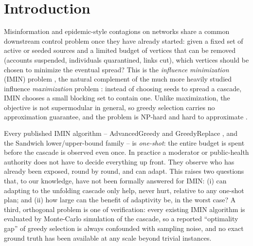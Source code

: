 \documentclass[ijoc,sglanonrev]{informs4}
\begin{document}


\maketitle

\section{Introduction}\label{sec:intro}

Misinformation and epidemic-style contagions on networks share a common
downstream control problem once they have already started: given a fixed
set of active or seeded sources and a limited budget of vertices that can be
removed (accounts suspended, individuals quarantined, links cut), which
vertices should be chosen to minimize the eventual spread? This is the
\emph{influence minimization} (IMIN) problem \citep{xie2023,xie2024}, the
natural complement of the much more heavily studied influence
\emph{maximization} problem \citep{kempe2003}: instead of choosing seeds to
spread a cascade, IMIN chooses a small blocking set to contain one. Unlike
maximization, the objective is not supermodular in general, so greedy
selection carries no approximation guarantee, and the problem is NP-hard and
hard to approximate \citep{xie2023}.

Every published IMIN algorithm -- AdvancedGreedy and GreedyReplace
\citep{xie2023,xie2024}, and the Sandwich lower/upper-bound family -- is
\emph{one-shot}: the entire budget is spent before the cascade is observed
even once. In practice a moderator or public-health authority does not have
to decide everything up front. They observe who has already been exposed,
round by round, and can adapt. This raises two questions that, to our
knowledge, have not been formally answered for IMIN: (i) can adapting to the
unfolding cascade only help, never hurt, relative to any one-shot plan; and
(ii) how large can the benefit of adaptivity be, in the worst case? A third,
orthogonal problem is one of verification: every existing IMIN algorithm is
evaluated by Monte-Carlo simulation of the cascade, so a reported
``optimality gap'' of greedy selection is always confounded with sampling
noise, and no exact ground truth has been available at any scale beyond
trivial instances.
\end{document}

